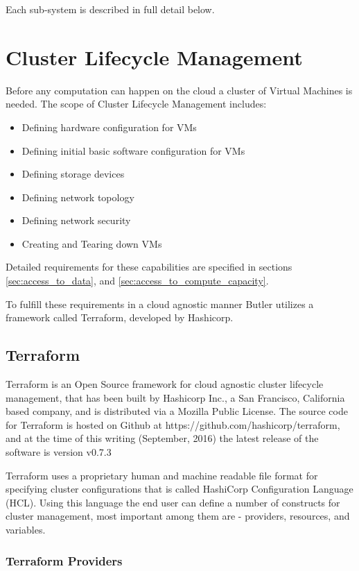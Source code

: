 Each sub-system is described in full detail below.

\section{Cluster Lifecycle Management}

Before any computation can happen on the cloud a cluster of Virtual Machines is needed. The scope of Cluster Lifecycle Management includes:

\begin{itemize}
\item Defining hardware configuration for VMs
\item Defining initial basic software configuration for VMs
\item Defining storage devices
\item Defining network topology
\item Defining network security
\item Creating and Tearing down VMs
\end{itemize}

Detailed requirements for these capabilities are specified in sections \ref{sec:access_to_data}, and \ref{sec:access_to_compute_capacity}.

To fulfill these requirements in a cloud agnostic manner Butler utilizes a framework called Terraform, developed by Hashicorp.

\subsection{Terraform}

Terraform is an Open Source framework for cloud agnostic cluster lifecycle management, that has been built by Hashicorp Inc., a San Francisco, California based company, and is distributed via a Mozilla Public License. The source code for Terraform is hosted on Github at https://github.com/hashicorp/terraform, and at the time of this writing (September, 2016) the latest release of the software is version v0.7.3

Terraform uses a proprietary human and machine readable file format for specifying cluster configurations that is called HashiCorp Configuration Language (HCL). Using this language the end user can define a number of constructs for cluster management, most important among them are - providers, resources, and variables.

\subsubsection {Terraform Providers}

